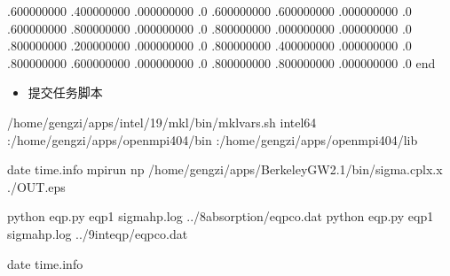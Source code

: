 \documentclass[a4paper,12pt,english]{sphinxmanual}
\begin{document}
\begin{sphinxVerbatim}[commandchars=\\\{\}]
  .600000000  .400000000  .000000000   .0 
  .600000000  .600000000  .000000000   .0 
  .600000000  .800000000  .000000000   .0 
  .800000000  .000000000  .000000000   .0 
  .800000000  .200000000  .000000000   .0 
  .800000000  .400000000  .000000000   .0 
  .800000000  .600000000  .000000000   .0 
  .800000000  .800000000  .000000000   .0 
end
\end{sphinxVerbatim}
\begin{itemize}
\item {} 
\sphinxAtStartPar
提交任务脚本

\end{itemize}

\begin{sphinxVerbatim}[commandchars=\\\{\}]

 
 /home/gengzi/apps/intel/19/mkl/bin/mklvars.sh intel64
 :/home/gengzi/apps/openmpi404/bin
 :/home/gengzi/apps/openmpi404/lib

date  \PYGZgt{}\PYGZgt{} time.info
mpirun \PYGZhy{}np  /home/gengzi/apps/BerkeleyGW\PYGZhy{}2.1/bin/sigma.cplx.x \PYGZgt{} ./OUT.eps

python eqp.py  eqp1  sigma\PYGZus{}hp.log ../8\PYGZhy{}absorption/eqp\PYGZus{}co.dat
python eqp.py  eqp1  sigma\PYGZus{}hp.log ../9\PYGZhy{}inteqp/eqp\PYGZus{}co.dat

date  \PYGZgt{}\PYGZgt{} time.info
\end{sphinxVerbatim}
\end{document}
